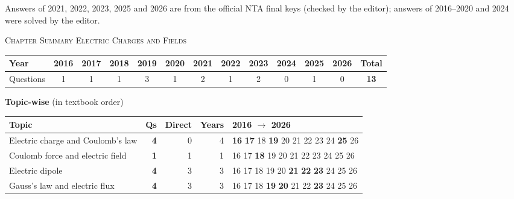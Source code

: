 {\footnotesize Answers of 2021, 2022, 2023, 2025 and 2026 are from the official NTA final keys (checked by the editor); answers of 2016--2020 and 2024 were solved by the editor.
}\par
\par{}\vspace{14pt}
\begin{center}{}\par
{\large\color{navy}\scshape Chapter Summary \textperiodcentered{} Electric Charges and Fields}\end{center}
{\small\setlength{\tabcolsep}{3.5pt}
\begin{tabular*}{\linewidth}{@{\extracolsep{\fill}}l*{11}{c}c@{}}\toprule
Year & 2016 & 2017 & 2018 & 2019 & 2020 & 2021 & 2022 & 2023 & 2024 & 2025 & 2026 & Total\\\midrule
Questions & 1 & 1 & 1 & 3 & 1 & 2 & 1 & 2 & 0 & 1 & 0 & \textbf{13}\\\bottomrule\end{tabular*}}\par\medskip
{\small\textbf{\color{crimson}Topic-wise} (in textbook order)\par\smallskip
\begin{tabularx}{\linewidth}{@{}>{\raggedright\arraybackslash}Xrrrl@{}}\toprule
Topic & Qs & Direct & Years & 2016 $\rightarrow$ 2026\\\midrule
Electric charge and Coulomb's law & \textbf{4} & 0 & 4 & {\scriptsize \textbf{16} \textbf{17} {\color{gray!45}18} \textbf{19} {\color{gray!45}20} {\color{gray!45}21} {\color{gray!45}22} {\color{gray!45}23} {\color{gray!45}24} \textbf{25} {\color{gray!45}26}}\\
Coulomb force and electric field & \textbf{1} & 1 & 1 & {\scriptsize {\color{gray!45}16} {\color{gray!45}17} \textbf{18} {\color{gray!45}19} {\color{gray!45}20} {\color{gray!45}21} {\color{gray!45}22} {\color{gray!45}23} {\color{gray!45}24} {\color{gray!45}25} {\color{gray!45}26}}\\
Electric dipole & \textbf{4} & 3 & 3 & {\scriptsize {\color{gray!45}16} {\color{gray!45}17} {\color{gray!45}18} {\color{gray!45}19} {\color{gray!45}20} \textbf{21} \textbf{22} \textbf{23} {\color{gray!45}24} {\color{gray!45}25} {\color{gray!45}26}}\\
Gauss's law and electric flux & \textbf{4} & 3 & 3 & {\scriptsize {\color{gray!45}16} {\color{gray!45}17} {\color{gray!45}18} \textbf{19} \textbf{20} {\color{gray!45}21} {\color{gray!45}22} \textbf{23} {\color{gray!45}24} {\color{gray!45}25} {\color{gray!45}26}}\\
\bottomrule\end{tabularx}}\par\medskip
